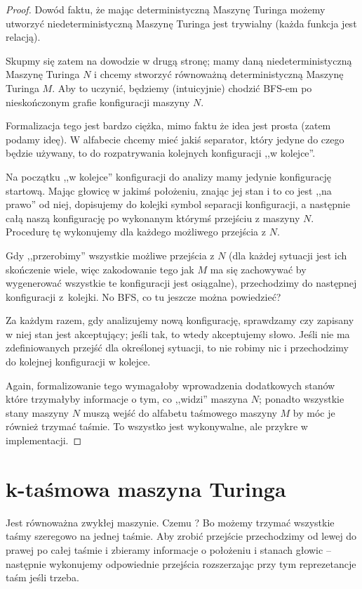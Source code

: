 \begin{proof}
	Dowód faktu, że mając deterministyczną Maszynę Turinga możemy utworzyć niedeterministyczną Maszynę Turinga jest trywialny (każda funkcja jest relacją).

	Skupmy się zatem na dowodzie w drugą stronę; mamy daną niedeterministyczną Maszynę Turinga \(N\) i chcemy stworzyć równoważną deterministyczną Maszynę Turinga \(M\). Aby to uczynić, będziemy (intuicyjnie) chodzić BFS-em po nieskończonym grafie konfiguracji maszyny \(N\).

	Formalizacja tego jest bardzo ciężka, mimo faktu że idea jest prosta (zatem podamy ideę). W alfabecie chcemy mieć jakiś separator, który jedyne do czego będzie używany, to do rozpatrywania kolejnych konfiguracji ,,w kolejce''.

	Na początku ,,w kolejce'' konfiguracji do analizy mamy jedynie konfigurację startową. Mając głowicę w jakimś położeniu, znając jej stan i to co jest ,,na prawo'' od niej, dopisujemy do kolejki symbol separacji konfiguracji, a następnie całą naszą konfigurację po wykonanym którymś przejściu z maszyny \(N\). Procedurę tę wykonujemy dla każdego możliwego przejścia z \(N\).

	Gdy ,,przerobimy'' wszystkie możliwe przejścia z \(N\) (dla każdej sytuacji jest ich skończenie wiele, więc zakodowanie tego jak \(M\) ma się zachowywać by wygenerować wszystkie te konfiguracji jest osiągalne), przechodzimy do następnej konfiguracji z~kolejki. No BFS, co tu jeszcze można powiedzieć?

	Za każdym razem, gdy analizujemy nową konfigurację, sprawdzamy czy zapisany w niej stan jest akceptujący; jeśli tak, to wtedy akceptujemy słowo. Jeśli nie ma zdefiniowanych przejść dla określonej sytuacji, to nie robimy nic i przechodzimy do kolejnej konfiguracji w kolejce.

	Again, formalizowanie tego wymagałoby wprowadzenia dodatkowych stanów które trzymałyby informacje o tym, co ,,widzi'' maszyna \(N\); ponadto wszystkie stany maszyny \(N\) muszą wejść do alfabetu taśmowego maszyny \(M\) by móc je również trzymać taśmie. To wszystko jest wykonywalne, ale przykre w implementacji.
\end{proof}

\section{k-taśmowa maszyna Turinga}

Jest równoważna zwykłej maszynie. Czemu ? Bo możemy trzymać wszystkie taśmy szeregowo na jednej taśmie. Aby zrobić przejście przechodzimy od lewej do prawej po całej taśmie i zbieramy informacje o położeniu i stanach głowic -- następnie wykonujemy odpowiednie przejścia rozszerzając przy tym reprezetancje taśm jeśli trzeba.


